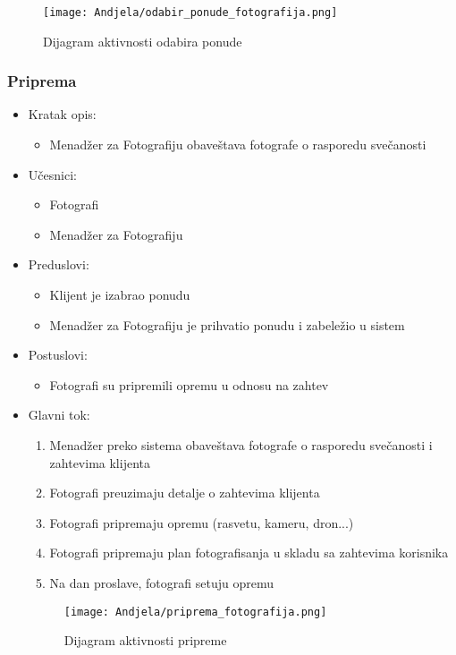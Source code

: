 \documentclass[a4paper]{article}
\begin{document}
\begin{itemize}
    \begin{figure}[H]
    \centering
    \texttt{[image: Andjela/odabir\_ponude\_fotografija.png]}
    \caption{Dijagram aktivnosti odabira ponude}
    \label{fig:RegistracijaZ}
\end{figure}
        
\end{itemize}

\subsubsection{Priprema}
\begin{itemize}
    \item Kratak opis: 
    \begin{itemize}
        \item Menadžer za Fotografiju obaveštava fotografe o rasporedu svečanosti
    \end{itemize}
    \item Učesnici:
        \begin{itemize}
        \item Fotografi
        \item Menadžer za Fotografiju
    \end{itemize}
    \item Preduslovi:
        \begin{itemize}
            \item Klijent je izabrao ponudu
            \item Menadžer za Fotografiju je prihvatio ponudu i zabeležio u sistem
        \end{itemize}
    \item Postuslovi:
        \begin{itemize}
            \item Fotografi su pripremili opremu u odnosu na zahtev
        \end{itemize}
    \item Glavni tok:
        \begin{enumerate}
            \item Menadžer preko sistema obaveštava fotografe o rasporedu svečanosti i zahtevima klijenta
            \item Fotografi preuzimaju detalje o zahtevima klijenta
            \item Fotografi pripremaju opremu (rasvetu, kameru, dron...)
            \item Fotografi pripremaju plan fotografisanja u skladu sa zahtevima korisnika
            \item Na dan proslave, fotografi setuju opremu
        \end{enumerate}
        
        \begin{figure}[H]
    \centering
\texttt{[image: Andjela/priprema\_fotografija.png]}
    \caption{Dijagram aktivnosti pripreme}
    \label{fig:RegistracijaZ}
\end{figure}
        
        
\end{itemize}
\end{document}
